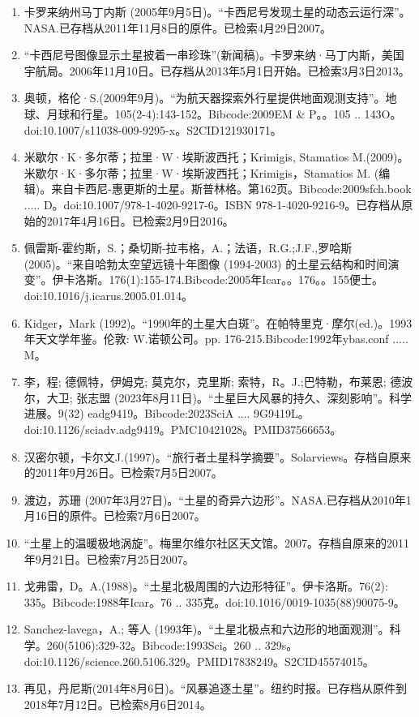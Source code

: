 \begin{enumerate}
\item 卡罗来纳州马丁内斯 (2005年9月5日)。“卡西尼号发现土星的动态云运行深”。NASA.已存档从2011年11月8日的原件。已检索4月29日2007。
\item “卡西尼号图像显示土星披着一串珍珠”(新闻稿)。卡罗来纳·马丁内斯，美国宇航局。2006年11月10日。已存档从2013年5月1日开始。已检索3月3日2013。
\item 奥顿，格伦·S.(2009年9月)。“为航天器探索外行星提供地面观测支持”。地球、月球和行星。105(2-4):143-152。Bibcode:2009EM & P。。105 .. 143O。doi:10.1007/s11038-009-9295-x。S2CID121930171。 
\item 米歇尔·K·多尔蒂；拉里·W·埃斯波西托；Krimigis, Stamatios M.(2009)。米歇尔·K·多尔蒂；拉里·W·埃斯波西托；Krimigis，Stamatios M. (编辑)。来自卡西尼-惠更斯的土星。斯普林格。第162页。Bibcode:2009sfch.book ..... D。doi:10.1007/978-1-4020-9217-6。ISBN 978-1-4020-9216-9。已存档从原始的2017年4月16日。已检索2月9日2016。
\item 佩雷斯-霍约斯，S.；桑切斯-拉韦格，A.；法语，R.G.;J.F.,罗哈斯 (2005)。“来自哈勃太空望远镜十年图像 (1994-2003) 的土星云结构和时间演变”。伊卡洛斯。176(1):155-174.Bibcode:2005年Icar。。176。。155便士。doi:10.1016/j.icarus.2005.01.014。
\item Kidger，Mark (1992)。“1990年的土星大白斑”。在帕特里克·摩尔(ed.)。1993年天文学年鉴。伦敦: W.诺顿公司。pp. 176-215.Bibcode:1992年ybas.conf ..... M。
\item 李，程; 德佩特，伊姆克; 莫克尔，克里斯; 索特，R。J.;巴特勒，布莱恩; 德波尔，大卫; 张志盟 (2023年8月11日)。“土星巨大风暴的持久、深刻影响”。科学进展。9(32) eadg9419。Bibcode:2023SciA .... 9G9419L。doi:10.1126/sciadv.adg9419。PMC10421028。PMID37566653。  
\item 汉密尔顿，卡尔文J.(1997)。“旅行者土星科学摘要”。Solarviews。存档自原来的2011年9月26日。已检索7月5日2007。
\item 渡边，苏珊 (2007年3月27日)。“土星的奇异六边形”。NASA.已存档从2010年1月16日的原件。已检索7月6日2007。
\item “土星上的温暖极地涡旋”。梅里尔维尔社区天文馆。2007。存档自原来的2011年9月21日。已检索7月25日2007。
\item 戈弗雷，D。A.(1988)。“土星北极周围的六边形特征”。伊卡洛斯。76(2): 335。Bibcode:1988年Icar。76 .. 335克。doi:10.1016/0019-1035(88)90075-9。
\item Sanchez-lavega，A.; 等人 (1993年)。“土星北极点和六边形的地面观测”。科学。260(5106):329-32。Bibcode:1993Sci。260 .. 329s。doi:10.1126/science.260.5106.329。PMID17838249。S2CID45574015。  
\item 再见，丹尼斯(2014年8月6日)。“风暴追逐土星”。纽约时报。已存档从原件到2018年7月12日。已检索8月6日2014。

\end{enumerate}
